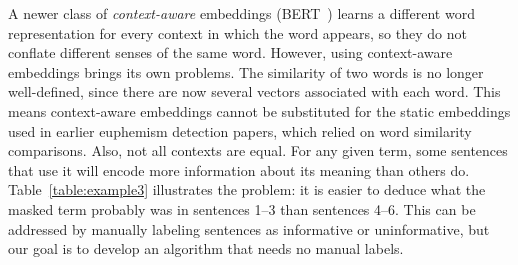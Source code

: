 A newer class of \emph{context-aware} embeddings (\eg BERT~\cite{devlin2019bert})
learns a different word representation
for every context in which the word appears,
so they do not conflate different senses of the same word.
However, using context-aware embeddings brings its own problems.
The similarity of two words is no longer well-defined,
since there are now several vectors associated with each word.
This means context-aware embeddings cannot be substituted
for the static embeddings used in earlier euphemism detection papers,
which relied on word similarity comparisons.
Also, not all contexts are equal.
For any given term,
some sentences that use it
will encode more information about its meaning
than others do.
Table~\ref{table:example3} illustrates the problem:
it is easier to deduce what the masked term probably was
in sentences 1--3
than sentences 4--6.
This can be addressed by manually labeling sentences
as informative or uninformative,
but our goal is to develop an algorithm that needs no manual labels.

%



